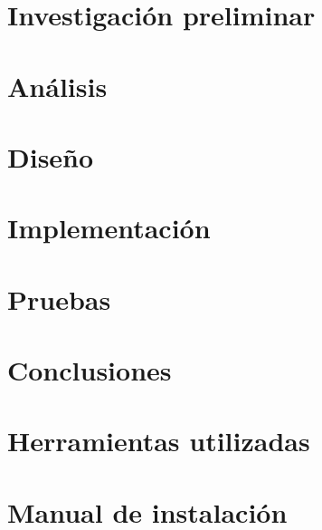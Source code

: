\documentclass[a4paper,12pt]{scrbook}
\begin{document}
\chapter{Investigación preliminar}


\chapter{Análisis}


\chapter{Diseño}


\chapter{Implementación}

\chapter{Pruebas}

%
 
\chapter{Conclusiones}
%

%
 
%

\appendix

\chapter{Herramientas utilizadas}

\chapter{Manual de instalación}
\end{document}
